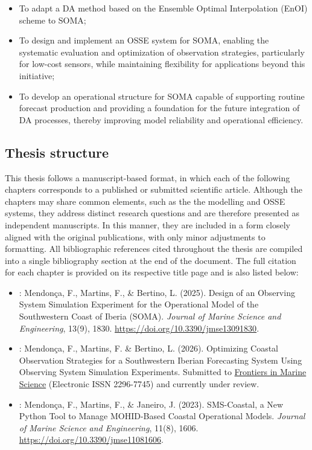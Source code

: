 \begin{itemize}
    \item To adapt a DA method based on the Ensemble Optimal Interpolation (EnOI) scheme to SOMA;
    
    \item To design and implement an OSSE system for SOMA, enabling the systematic evaluation and optimization of observation strategies, particularly for low-cost sensors, while maintaining flexibility for applications beyond this initiative;
    
    \item To develop an operational structure for SOMA capable of supporting routine forecast production and providing a foundation for the future integration of DA processes, thereby improving model reliability and operational efficiency.
\end{itemize}

\subsection*{Thesis structure}

This thesis follows a manuscript-based format, in which each of the following chapters corresponds to a published or submitted scientific article. Although the chapters may share common elements, such as the the modelling and OSSE systems, they address distinct research questions and are therefore presented as independent manuscripts. In this manner, they are included in a form closely aligned with the original publications, with only minor adjustments to formatting. All bibliographic references cited throughout the thesis are compiled into a single bibliography section at the end of the document. The full citation for each chapter is provided on its respective title page and is also listed below:

\begin{itemize}
    \item {}: Mendonça, F., Martins, F., \& Bertino, L. (2025). Design of an Observing System Simulation Experiment for the Operational Model of the Southwestern Coast of Iberia (SOMA). \textit{Journal of Marine Science and Engineering}, 13(9), 1830. \href{https://doi.org/10.3390/jmse13091830}{https://doi.org/10.3390/jmse13091830}.

    \item {}: Mendonça, F., Martins, F. \& Bertino, L. (2026). Optimizing Coastal Observation Strategies for a Southwestern Iberian Forecasting System Using Observing System Simulation Experiments. Submitted to \href{https://www.frontiersin.org/journals/marine-science}{Frontiers in Marine Science} (Electronic ISSN 2296-7745) and currently under review.
    
    \item {}: Mendonça, F., Martins, F., \& Janeiro, J. (2023). SMS-Coastal, a New Python Tool to Manage MOHID-Based Coastal Operational Models. \textit{Journal of Marine Science and Engineering}, 11(8), 1606. \href{https://doi.org/10.3390/jmse11081606}{https://doi.org/10.3390/jmse11081606}.
\end{itemize}


